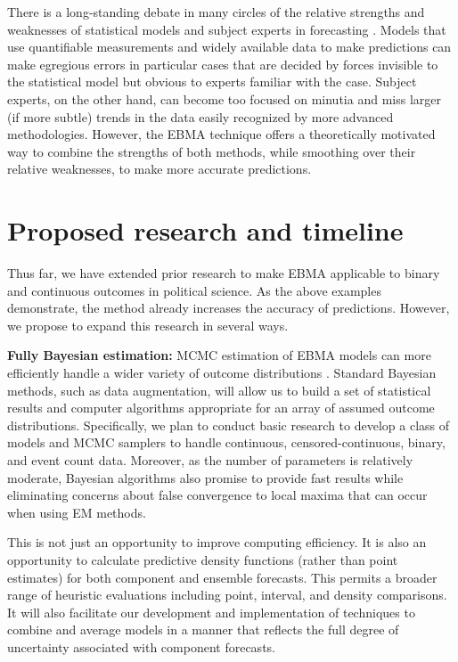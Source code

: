 \documentclass[pdftex,12pt,fullpage,oneside]{amsart}
\begin{document}
There is a long-standing debate in many circles of the relative
strengths and weaknesses of statistical models and subject experts in
forecasting \citep[e.g.,][]{Ascher:1979}.  Models that use
quantifiable measurements and widely available data to make
predictions can make egregious errors in particular cases that are
decided by forces invisible to the statistical model but obvious to
experts familiar with the case.  Subject experts, on the other hand,
can become too focused on minutia and miss larger (if more subtle)
trends in the data easily recognized by more advanced methodologies.
However, the EBMA technique offers a theoretically motivated way to
combine the strengths of both methods, while smoothing over their
relative weaknesses, to make more accurate predictions.

\section{Proposed research and timeline}

Thus far, we have extended prior research to make EBMA applicable to
binary and continuous outcomes in political science.  As the above
examples demonstrate, the method already increases the accuracy of
predictions.  However, we propose to expand this research in several
ways.

\textbf{Fully Bayesian estimation:} MCMC estimation of EBMA models can
more efficiently handle a wider variety of outcome distributions
\citep{Vrugt:2008}.  Standard Bayesian methods, such as data
augmentation, will allow us to build a set of statistical results and
computer algorithms appropriate for an array of assumed outcome
distributions.  Specifically, we plan to conduct basic research to
develop a class of models and MCMC samplers to handle continuous,
censored-continuous, binary, and event count data. Moreover, as the
number of parameters is relatively moderate, Bayesian algorithms also
promise to provide fast results while eliminating concerns about false
convergence to local maxima that can occur when using EM methods.
  
This is not just an opportunity to improve computing efficiency.  It
is also an opportunity to calculate predictive density functions
(rather than point estimates) for both component and ensemble
forecasts. This permits a broader range of heuristic evaluations
including point, interval, and density comparisons.  It will also
facilitate our development and implementation of techniques to combine
and average models in a manner that reflects the full degree of
uncertainty associated with component forecasts.
  
\end{document}
